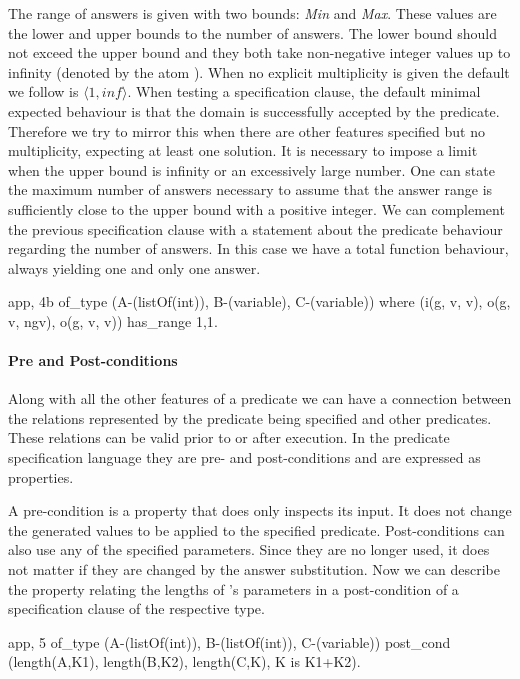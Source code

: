 The range of answers is given with two bounds: \emph{Min} and
\emph{Max}.
%
These values are the lower and upper bounds to the number of answers.
%
The lower bound should not exceed the upper bound and they both take
non-negative integer values up to infinity (denoted by the atom
).
%
When no explicit multiplicity is given the default we %
follow is
$\langle 1, inf \rangle $.
%
When testing a specification clause, the default minimal expected
behaviour is that the domain is successfully accepted by the predicate.
%
Therefore we try to mirror this when there are other features
specified but no multiplicity, expecting at least one solution.
%
It is necessary to impose a limit when the upper bound is infinity or an
excessively large number.
%
One can state the maximum number of answers necessary to assume that the
answer range is sufficiently close to the upper bound with a positive
integer.
%
We can complement the previous specification clause with a statement
about the predicate behaviour regarding the number of answers.
%
In this case we have a total function behaviour, always yielding one and
only one answer.
%
\begin{yapcode}
 {app, 4b} of_type (A-(listOf(int)), B-(variable), C-(variable))
    where (i(g, v, v), o(g, v, ngv), o(g, v, v))
    has_range {1,1}.
\end{yapcode}

\paragraph{\bf Pre and Post-conditions}

Along with all the other features of a predicate we can have a
connection between the relations represented by the predicate being
specified and other predicates.
%
These relations can be valid prior to or after execution.
%
In the predicate specification language they are pre- and
post-conditions and are expressed as \plqc{} properties.


A pre-condition is a property that does only inspects its input.
%
It does not change the generated values to be applied to the specified
predicate.
%
Post-conditions can also use any of the specified parameters.
%
Since they are no longer used, it does not matter if they are changed by
the answer substitution.
%
Now we can describe the property relating the lengths of 's
parameters in a post-condition of a specification clause of the
respective type.
%
\begin{yapcode}
 {app, 5} of_type (A-(listOf(int)), B-(listOf(int)), C-(variable))
   post_cond (length(A,K1), length(B,K2), length(C,K), K is K1+K2).
\end{yapcode}

